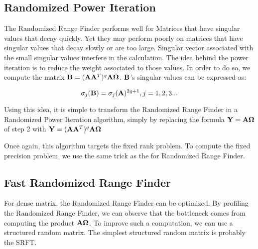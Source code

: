 \documentclass[onecolumn,12pt]{article}
\begin{document}
\subsection{Randomized Power Iteration}

The Randomized Range Finder performs well for Matrices that have singular
values that decay quickly. Yet they may perform poorly on matrices that have
singular values that decay slowly or are too large. Singular vector associated
with the small singular values interfere in the calculation. The idea behind
the power iteration is to reduce the weight associated to those values. In
order to do so, we compute the matrix 
$\bold{B} = (\bold{A}\bold{A}^T)^q\bold{A} \bold{\Omega}$. $\bold{B}$'s singular
values can be expressed as:

\begin{equation}
\label{rps-svd}
\sigma_j(\bold{B}) = \sigma_j(\bold{A})^{2q+1}, j=1, 2, 3...
\end{equation}

Using this idea, it is simple to transform the Randomized Range Finder in a
Randomized Power Iteration algorithm, simply by replacing the formula
$\bold{Y} = \bold{A} \bold{\Omega}$ of step 2 with 
$\bold{Y} = (\bold{A}\bold{A}^T)^q\bold{A}  \bold{\Omega}$

\noindent{}

Once again, this algorithm targets the fixed rank problem. To compute the
fixed precision problem, we use the same trick as the for Randomized Range
Finder.

\subsection{Fast Randomized Range Finder}

For dense matrix, the Randomized Range Finder can be optimized. By profiling
the Randomized Range Finder, we can observe that the bottleneck comes from
computing the product $\bold{A} \bold{\Omega}$. To improve such a computation,
we can use a structured random matrix. The simplest structured random matrix
is probably the SRFT.
\end{document}
